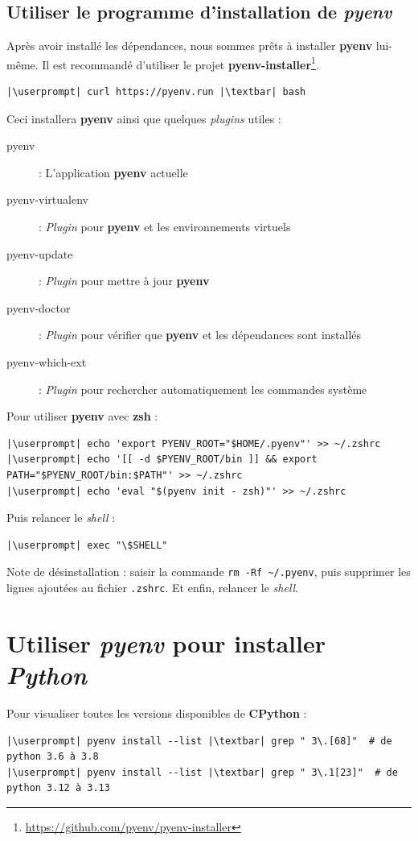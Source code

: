 \subsection*{Utiliser le programme d'installation de \textit{pyenv}}
Après avoir installé les dépendances, nous sommes prêts à installer \textbf{pyenv} lui-même. Il est recommandé d'utiliser le projet \textbf{pyenv-installer}\footnote{\url{https://github.com/pyenv/pyenv-installer}}.
\begin{lstlisting}[style=bash]
|\userprompt| curl https://pyenv.run |\textbar| bash
\end{lstlisting}

Ceci installera \textbf{pyenv} ainsi que quelques \textit{plugins} utiles :
\begin{description}
    \item[pyenv]: L'application \textbf{pyenv} actuelle
    \item[pyenv-virtualenv] : \textit{Plugin} pour \textbf{pyenv} et les environnements virtuels
    \item[pyenv-update] : \textit{Plugin} pour mettre à jour \textbf{pyenv}
    \item[pyenv-doctor] : \textit{Plugin} pour vérifier que \textbf{pyenv} et les dépendances sont installés
    \item[pyenv-which-ext] : \textit{Plugin} pour rechercher automatiquement les commandes système
\end{description}
\bigskip

Pour utiliser \textbf{pyenv} avec \textbf{zsh} :
\begin{lstlisting}[style=bash]
|\userprompt| echo 'export PYENV_ROOT="$HOME/.pyenv"' >> ~/.zshrc
|\userprompt| echo '[[ -d $PYENV_ROOT/bin ]] && export PATH="$PYENV_ROOT/bin:$PATH"' >> ~/.zshrc
|\userprompt| echo 'eval "$(pyenv init - zsh)"' >> ~/.zshrc 
\end{lstlisting}

Puis relancer le \textit{shell} :
\begin{lstlisting}[style=bash]
|\userprompt| exec "\$SHELL"
\end{lstlisting}

Note de désinstallation  : saisir la commande \verb|rm -Rf ~/.pyenv|, puis supprimer les lignes ajoutées au fichier \texttt{.zshrc}. Et enfin, relancer le \textit{shell}.

\section{Utiliser \textit{pyenv} pour installer \textit{Python}}
Pour visualiser toutes les versions disponibles de \textbf{CPython} :
\begin{lstlisting}[style=bash]
|\userprompt| pyenv install --list |\textbar| grep " 3\.[68]"  # de python 3.6 à 3.8
|\userprompt| pyenv install --list |\textbar| grep " 3\.1[23]"  # de python 3.12 à 3.13
\end{lstlisting}

